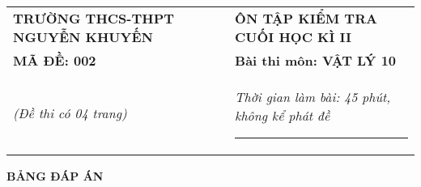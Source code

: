 \begin{center}
	\begin{tabular}{M{9.25cm}M{8.75cm}}
		\textbf{TRƯỜNG THCS-THPT NGUYỄN KHUYẾN}& \textbf{ÔN TẬP KIỂM TRA CUỐI HỌC KÌ II}\\
		\textbf{MÃ ĐỀ: 002}& \textbf{Bài thi môn: VẬT LÝ 10}\\
		\textit{(Đề thi có 04 trang)}& \textit{Thời gian làm bài: 45 phút, không kể phát đề}
		
		\noindent\rule{4cm}{0.8pt} \\
	\end{tabular}
\end{center}
\setcounter{section}{0}
\begin{center}
	\textbf{\large BẢNG ĐÁP ÁN}
\end{center}
\section{}
\section{}
